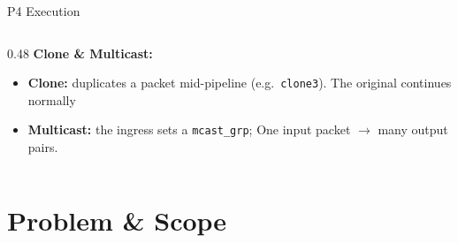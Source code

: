 \documentclass[aspectratio=169]{beamer}
\begin{document}
\begin{hidden}
\begin{frame}{P4 Execution}
\begin{columns}[T]
\begin{column}{0.48\textwidth}
\small
\textbf{Clone \& Multicast:}
\begin{itemize}\setlength\itemsep{3pt}
  \item \textbf{Clone:} duplicates a packet mid-pipeline (e.g.\ \texttt{clone3}). The original continues normally
  \item \textbf{Multicast:} the ingress sets a \texttt{mcast\_grp}; One input packet $\to$ many output pairs.
\end{itemize}
\end{column}
\end{columns}
\end{frame}
\end{hidden}





\section{Problem \& Scope}
\end{document}
